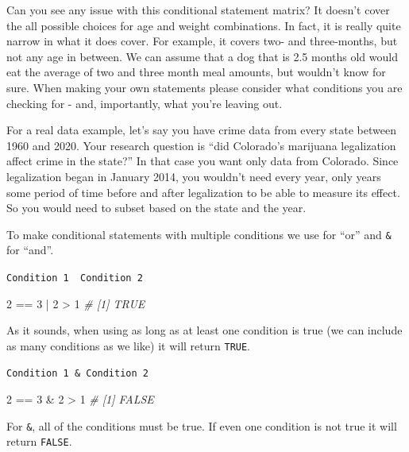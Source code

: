 \documentclass[
  a4paper,
]{krantz}
\makeatletter
\newenvironment{Shaded}{\begin{snugshade}}{\end{snugshade}}
\newcommand{\CommentTok}[1]{\textcolor[rgb]{0.37,0.37,0.37}{\textit{#1}}}
\newcommand{\DecValTok}[1]{\textcolor[rgb]{0.06,0.06,0.06}{#1}}
\newcommand{\SpecialCharTok}[1]{\textcolor[rgb]{0,0,0}{#1}}
\newenvironment{kframe}{%
\medskip{}
\setlength{\fboxsep}{.8em}
 \def\at@end@of@kframe{}%
 \ifinner\ifhmode%
  \def\at@end@of@kframe{\end{minipage}}%
  \begin{minipage}{\columnwidth}%
 \fi\fi%
 \def\FrameCommand##1{\hskip\@totalleftmargin \hskip-\fboxsep
 \colorbox{shadecolor}{##1}\hskip-\fboxsep
     \hskip-\linewidth \hskip-\@totalleftmargin \hskip\columnwidth}%
 \MakeFramed {\advance\hsize-\width
   \@totalleftmargin\z@ \linewidth\hsize
   \@setminipage}}%
 {\par\unskip\endMakeFramed%
 \at@end@of@kframe}
\renewenvironment{Shaded}{\begin{kframe}}{\end{kframe}}
\makeatother
\begin{document}
Can you see any issue with this conditional statement
matrix? It doesn't cover the all possible choices for age
and weight combinations. In fact, it is really quite narrow
in what it does cover. For example, it covers two- and
three-months, but not any age in between. We can assume that
a dog that is 2.5 months old would eat the average of two
and three month meal amounts, but wouldn't know for sure.
When making your own statements please consider what
conditions you are checking for - and, importantly, what
you're leaving out.

For a real data example, let's say you have crime data from
every state between 1960 and 2020. Your research question is
``did Colorado's marijuana legalization affect crime in the
state?'' In that case you want only data from Colorado.
Since legalization began in January 2014, you wouldn't need
every year, only years some period of time before and after
legalization to be able to measure its effect. So you would
need to subset based on the state and the year.

To make conditional statements with multiple conditions we
use \texttt{\textbar{}} for ``or'' and \texttt{\&} for
``and''.

\texttt{Condition\ 1\ \textbar{}\ Condition\ 2}

\begin{Shaded}
\begin{Highlighting}[]
\DecValTok{2} \SpecialCharTok{==} \DecValTok{3} \SpecialCharTok{|} \DecValTok{2} \SpecialCharTok{\textgreater{}} \DecValTok{1}
\CommentTok{\# [1] TRUE}
\end{Highlighting}
\end{Shaded}

As it sounds, when using \texttt{\textbar{}} as long as at
least one condition is true (we can include as many
conditions as we like) it will return \texttt{TRUE}.

\texttt{Condition\ 1\ \&\ Condition\ 2}

\begin{Shaded}
\begin{Highlighting}[]
\DecValTok{2} \SpecialCharTok{==} \DecValTok{3} \SpecialCharTok{\&} \DecValTok{2} \SpecialCharTok{\textgreater{}} \DecValTok{1}
\CommentTok{\# [1] FALSE}
\end{Highlighting}
\end{Shaded}

For \texttt{\&}, all of the conditions must be true. If even
one condition is not true it will return \texttt{FALSE}.
\end{document}
